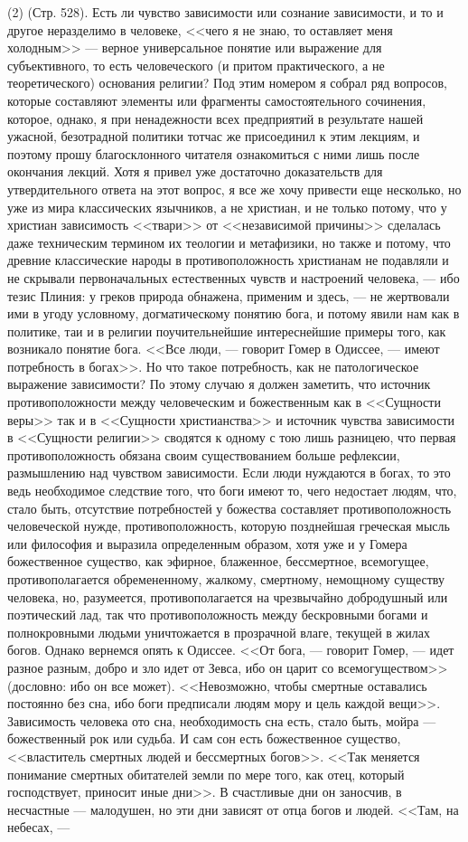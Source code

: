 \documentclass[12pt]{article}
\begin{document}
(2) (Стр. 528). Есть ли чувство зависимости или сознание зависимости, и то и другое неразделимо в человеке, <<чего я не знаю, то оставляет меня холодным>>  --- верное универсальное понятие или выражение для субъективного, то есть человеческого (и притом практического, а не теоретического) основания религии? Под этим номером я собрал ряд вопросов, которые составляют элементы или фрагменты самостоятельного сочинения, которое, однако, я при ненадежности всех предприятий в результате нашей ужасной, безотрадной политики тотчас же присоединил к этим лекциям, и поэтому прошу благосклонного читателя ознакомиться с ними лишь после окончания лекций. Хотя я привел уже достаточно доказательств для утвердительного ответа на этот вопрос, я все же хочу привести еще несколько, но уже из мира классических язычников, а не христиан, и не только потому, что у христиан зависимость <<твари>> от <<независимой причины>> сделалась даже техническим термином их теологии и метафизики, но также и потому, что древние классические народы в противоположность христианам не подавляли и не скрывали первоначальных естественных чувств и настроений человека, --- ибо тезис Плиния: у греков природа обнажена, применим и здесь, --- не жертвовали ими в угоду условному, догматическому понятию бога, и потому явили нам как в политике, таи и в религии поучительнейшие интереснейшие примеры того, как возникало понятие бога. <<Все люди, --- говорит Гомер в Одиссее, --- имеют потребность в богах>>. Но что такое потребность, как не патологическое выражение зависимости? По этому случаю я должен заметить, что источник противоположности между человеческим и божественным как в <<Сущности веры>>  так и в <<Сущности христианства>> и источник чувства зависимости в <<Сущности религии>> сводятся к одному с тою лишь разницею, что первая противоположность обязана своим существованием больше рефлексии, размышлению над чувством зависимости. Если люди нуждаются в богах, то это ведь необходимое следствие того, что боги имеют то, чего недостает людям, что, стало быть, отсутствие потребностей у божества составляет противоположность человеческой нужде, противоположность, которую позднейшая греческая мысль или философия и выразила определенным образом, хотя уже и у Гомера божественное существо, как эфирное, блаженное, бессмертное, всемогущее, противополагается обремененному, жалкому, смертному, немощному существу человека, но, разумеется, противополагается на чрезвычайно добродушный или поэтический лад, так что противоположность между бескровными богами и полнокровными людьми уничтожается в прозрачной влаге, текущей в жилах богов. Однако вернемся опять к Одиссее. <<От бога, --- говорит Гомер, --- идет разное разным, добро и зло идет от Зевса, ибо он царит со всемогуществом>> (дословно: ибо он все может). <<Невозможно, чтобы смертные оставались постоянно без сна, ибо боги предписали людям мору и цель каждой вещи>>. Зависимость человека ото сна, необходимость сна есть, стало быть, мойра --- божественный рок или судьба. И сам сон есть божественное существо, <<властитель смертных людей и бессмертных богов>>. <<Так меняется понимание смертных обитателей земли по мере того, как отец, который господствует, приносит иные дни>>. В счастливые дни он заносчив, в несчастные --- малодушен, но эти дни зависят от отца богов и людей. <<Там, на небесах, --- 
\end{document}
